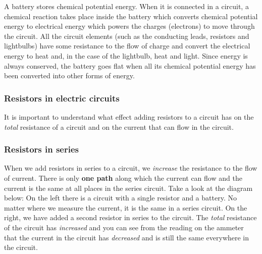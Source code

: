           
          \label{m38776*id67413}A battery stores chemical potential energy. When it is connected in a circuit, a chemical reaction takes place inside the battery which converts chemical potential energy to electrical energy which powers the charges (electrons) to move through the circuit. All the circuit elements (such as the conducting leads, resistors and lightbulbs) have some resistance to the flow of charge and convert the electrical energy to heat and, in the case of the lightbulb, heat and light.
Since energy is always conserved, the battery goes flat when all its chemical potential energy has been converted into other forms of energy.\par 
        

      
      \label{m38776*uid65}
            \subsubsection{ Resistors in electric circuits}
            \nopagebreak
            
        
        \label{m38776*id67431}It is important to understand what effect adding resistors to a circuit has on the \textsl{total} resistance of a circuit and on the current that can flow in the circuit.\par 
        \label{m38776*uid66}
            \subsubsection{ Resistors in series}
            \nopagebreak
            
          
          \label{m38776*id67450}When we add resistors in series to a circuit, we \textsl{increase} the resistance to the flow of current. There is only \textbf{one path} along which the current can flow and the current is the same at all places in the series circuit. Take a look at the diagram below: On the left there is a circuit with a single resistor and a battery. No matter where we measure the current, it is the same in a series circuit. On the right, we have added a second resistor in series to the circuit. The \textsl{total} resistance of the circuit has \textsl{increased} and you can see from the reading on the ammeter that the current in the circuit has \textsl{decreased} and is still the same everywhere in the circuit.\par 
          \label{m38776*id67481}
            
    \setcounter{subfigure}{0}


